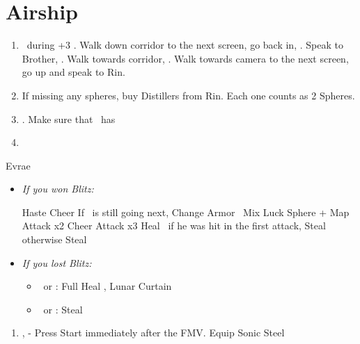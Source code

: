 \chapter{Airship}

\begin{enumerate}
  \item \sd\ during \cs+3 \skippablefmv. Walk down corridor to the next screen, go back in, \sd. Speak to Brother, \sd. Walk towards corridor, \sd. Walk towards camera to the next screen, go up and speak to Rin.
  \item If missing any spheres, buy Distillers from Rin. Each one counts as 2 Spheres.
  \item \save. Make sure that \rikku\ has \od
  \item \formation{\tidus}{\rikku}{\kimahri}
\end{enumerate}
\vfill
\begin{battle}[32000]{Evrae}
  \begin{itemize}
    \item \textit{If you won Blitz:}
          \begin{itemize}
            \tidusf Haste \tidus
            \tidusf Cheer
            \tidusf If \tidus\ is still going next, Change Armor
            \rikkuf \od\ Mix Luck Sphere + Map
            \tidusf Attack x2
            \tidusf Cheer
            \tidusf Attack x3
            \kimahrif Heal \tidus\ if he was hit in the first attack, Steal otherwise
            \rikkuf Steal
          \end{itemize}
    \item \textit{If you lost Blitz:}
          \begin{itemize}
            \tidusf Haste \tidus
            \tidusf Cheer x2
            \tidusf Equip Baroque Sword
            \tidusf Attack x6
            \rikkuf \od\ Mix Luck Sphere + Map
            \item \kimahri\ or \rikku: Full Heal \tidus, Lunar Curtain \tidus
            \item \kimahri\ or \rikku: Steal
          \end{itemize}
  \end{itemize}
\end{battle}
\begin{enumerate}[resume]
  \item \sd, \skippablefmv[3:00] - Press Start immediately after the FMV.
  \tidusf Equip Sonic Steel
\end{enumerate}